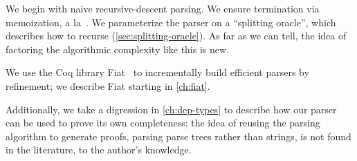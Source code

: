   We begin with naive recursive-descent parsing.  We ensure termination via memoization, a la~\cite{Ridge}.  We parameterize the parser on a ``splitting oracle'', which describes how to recurse (\autoref{sec:splitting-oracle}).  As far as we can tell, the idea of factoring the algorithmic complexity like this is new.
  
  We use the Coq library Fiat~\cite{delaware2015fiat} to incrementally build efficient parsers by refinement; we describe Fiat starting in \autoref{ch:fiat}.
  
  Additionally, we take a digression in \autoref{ch:dep-types} to describe how our parser can be used to prove its own completeness; the idea of reusing the parsing algorithm to generate proofs, parsing parse trees rather than strings, is not found in the literature, to the author's knowledge.
